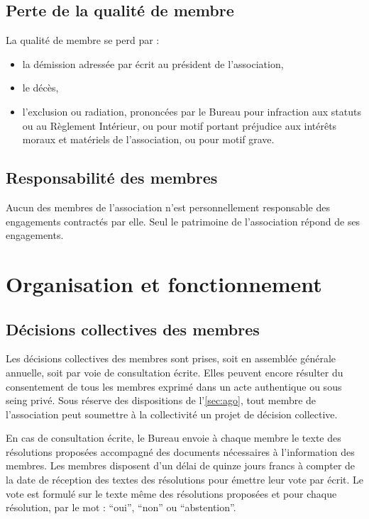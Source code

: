 \documentclass[a4paper,french,10pt]{article}
\begin{document}
\subsection{Perte de la qualité de membre}
\label{sec:perte}
La qualité de membre se perd par :
\begin{itemize}
\item la démission adressée par écrit au président de l'association,

\item le décès,

\item l'exclusion ou radiation, prononcées par le Bureau pour infraction
aux statuts ou au Règlement Intérieur, ou pour motif portant préjudice
aux intérêts moraux et matériels de l'association, ou pour motif
grave.
\end{itemize}


\subsection{Responsabilité des membres}
\label{sec:responsabilite}
Aucun des membres de l’association n’est personnellement responsable
des engagements contractés par elle. Seul le patrimoine de
l’association répond de ses engagements.


\section{Organisation et fonctionnement}


\subsection{Décisions collectives des membres}
\label{sec:decisions-collectives}

Les décisions collectives des membres sont prises, soit en assemblée
générale annuelle, soit par voie de consultation écrite. Elles peuvent
encore résulter du consentement de tous les membres exprimé dans un
acte authentique ou sous seing privé. Sous réserve des dispositions de
l’\ref{sec:ago}, tout membre de l’association peut soumettre à la
collectivité un projet de décision collective.

En cas de consultation écrite, le Bureau envoie à chaque membre le
texte des résolutions proposées accompagné des documents nécessaires à
l’information des membres. Les membres disposent d’un délai de quinze
jours francs à compter de la date de réception des textes des
résolutions pour émettre leur vote par écrit. Le vote est formulé sur
le texte même des résolutions proposées et pour chaque résolution, par
le mot : “oui”, “non” ou “abstention”.
\end{document}
